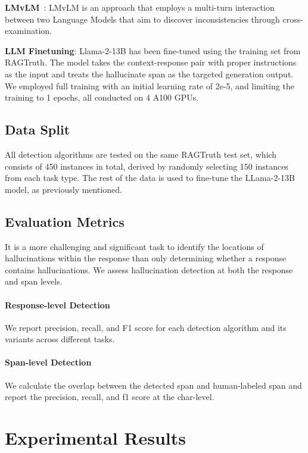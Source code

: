 \documentclass[11pt]{article}
\newcommand{\CorpusName}{RAGTruth}
\begin{document}
\noindent \textbf{LMvLM}~\citep{cohen2023lm}: LMvLM is an approach that employs a multi-turn interaction between two Language Models that aim to discover inconsistencies through cross-examination.

\noindent \textbf{LLM Finetuning}: Llama-2-13B has been fine-tuned using the training set from {\CorpusName}. The model takes the context-response pair with proper instructions as the input and treats the hallucinate span as the targeted generation output. We employed full training  with an initial learning rate of 2e-5, and limiting the training to 1 epochs, all conducted on 4 A100 GPUs. 

\subsection{Data Split}
All detection algorithms are tested on the same {\CorpusName} test set, which consists of 450 instances in total, derived by randomly selecting 150 instances from each task type. The rest of the data is used to fine-tune the LLama-2-13B model, as previously mentioned.

\subsection{Evaluation Metrics}
It is a more challenging and significant task to identify the locations of hallucinations within the response than only determining whether a response contains hallucinations. We assess hallucination detection at both the response and span levels.

\paragraph{Response-level Detection} We report precision, recall, and F1 score for each detection algorithm and its variants across different tasks.
\paragraph{Span-level Detection} We calculate the overlap between the detected span and human-labeled span and report the precision, recall, and f1 score at the char-level.

\section{Experimental Results} 
\end{document}
